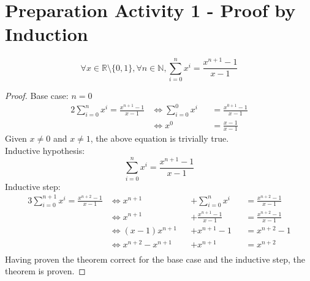 \setcounter{section}{0}
\section{Preparation Activity 1 - Proof by Induction}
\begin{theorem}
	\begin{equation*}
		\forall x \in \mathbb{R}\setminus \{0,1\},\forall n \in \mathbb{N}, \sum_{i=0}^{n}{x^i} = \frac{x^{n+1}-1}{x-1}
	\end{equation*}
\end{theorem}
\begin{proof}
Base case: $n=0$
\begin{alignat*}{2}
	\sum_{i=0}^{n}{x^i} = \frac{x^{n+1}-1}{x-1}
	&\iff \sum_{i=0}^{0}{x^i} &&= \frac{x^{0+1}-1}{x-1}\\
	&\iff x^0                 &&= \frac{x-1}{x-1}
\end{alignat*}
Given $x \neq 0$ and $x \neq 1$, the above equation is trivially true.\\
Inductive hypothesis:
\begin{equation*}
\sum_{i=0}^{n}{x^i} = \frac{x^{n+1}-1}{x-1}
\end{equation*}
Inductive step:
\begin{alignat*}{3}
	\sum_{i=0}^{n+1}{x^i} = \frac{x^{n+2}-1}{x-1}
	&\iff x^{n+1}         &&+\sum_{i=0}^{n}{x^i}   &&= \frac{x^{n+2}-1}{x-1}\\
	&\iff x^{n+1}         &&+\frac{x^{n+1}-1}{x-1} &&= \frac{x^{n+2}-1}{x-1}\\
	&\iff (x-1)x^{n+1}    &&+x^{n+1}-1             &&= x^{n+2}-1\\
	&\iff x^{n+2}-x^{n+1} &&+x^{n+1}               &&= x^{n+2}\\
\end{alignat*}
Having proven the theorem correct for the base case and the inductive step, the theorem is proven.
\end{proof}